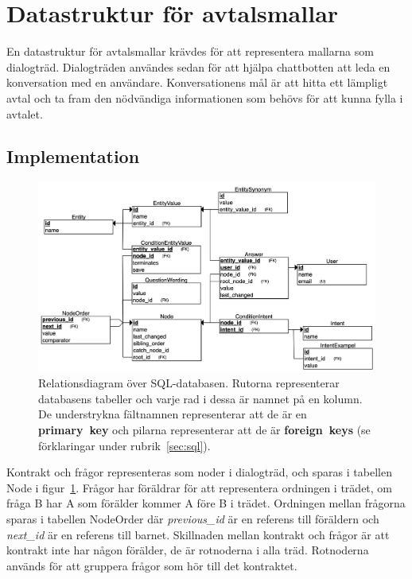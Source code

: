 \documentclass[a4paper,12pt]{article}
\begin{document}
\section{Datastruktur för avtalsmallar}

En datastruktur för avtalsmallar krävdes för att representera mallarna som dialogträd. Dialogträden användes sedan för att hjälpa chattbotten att leda en konversation med en användare. Konversationens mål är att hitta ett lämpligt avtal och ta fram den nöd\-vändiga informationen som behövs för att kunna fylla i avtalet. 

\subsection{Implementation}
\FloatBarrier

\begin{figure}[H]
    \centering
    \includegraphics[width=\textwidth]{img/relational.png}
    \caption{Relationsdiagram över SQL-databasen. Rutorna representerar databasens tabeller och varje rad i dessa är namnet på en kolumn. De understrykna fältnamnen representerar att de är en \mbox{\textbf{primary key}} och pilarna representerar att de är \mbox{\textbf{foreign keys}} (se förklaringar under rubrik~\ref{sec:sql}).}
    \label{fig:relation-schema}
\end{figure}

Kontrakt och frågor representeras som noder i dialogträd, och sparas i tabellen \mbox{Node} i figur~\ref{fig:relation-schema}. Frågor har föräldrar för att representera ordningen i trädet, om fråga B har A som förälder kommer A före B i trädet. Ordn\-ingen mellan fråg\-orna sparas i tab\-ellen \mbox{NodeOrder} där \mbox{\emph{previous\_id}} är en referens till föräldern och \mbox{\emph{next\_id}} är en referens till barnet. Skillnaden mellan kontrakt och frågor är att kontrakt inte har någon förälder, de är rotnoderna i alla träd. Rotnoderna används för att gruppera frågor som hör till det kontraktet.
\end{document}

